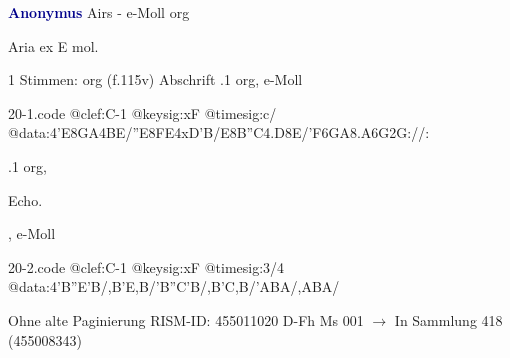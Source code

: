 \documentclass[twocolumn]{book}
\begin{document}
\newline \par \vspace{7pt} \textcolor{darkblue}{\textbf{Anonymus  }}
\newline Airs - e-Moll
\newline org
\newline \begin{itshape}[f.115v, heading:] Aria ex E mol.\end{itshape} 
\newline \textcolor{darkblue}{}  1 Stimmen: org  (f.115v)
\newline Abschrift
.1  org, e-Moll  
\begin{filecontents*}{20-1.code}
@clef:C-1
@keysig:xF
@timesig:c/
@data:4'E{8GA}4BE/''E{8FE}4xD'B/E{8B''C}4.D8E/{'F6GA}{8.A6G}2G://:
\end{filecontents*}
\newline
%
.1  org, \begin{itshape}Echo.\end{itshape}, e-Moll  
\begin{filecontents*}{20-2.code}
@clef:C-1
@keysig:xF
@timesig:3/4
@data:4'B''E'B/,B'E,B/'B''C'B/,B'C,B/'ABA/,ABA/
\end{filecontents*}
\newline
%
\newline Ohne alte Paginierung
\newline RISM-ID: 455011020
\newline D-Fh  Ms 001
\newline $\rightarrow$ In Sammlung 418 (455008343)
      
\end{document}
